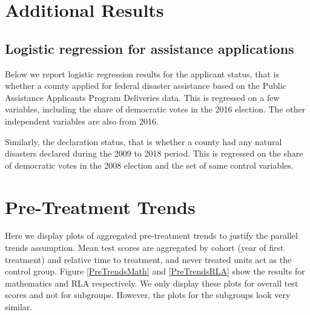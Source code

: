 
\section{Additional Results} \label{AppendixA}

\subsection{Logistic regression for assistance applications}

Below we report logistic regression results for the applicant status, that is whether a county applied for federal disaster assistance based on the Public Assistance Applicants Program Deliveries data. This is regressed on a few variables, including the share of democratic votes in the 2016 election. The other independent variables are also from 2016.

Similarly, the declaration status, that is whether a county had any natural disasters declared during the 2009 to 2018 period. This is regressed on the share of democratic votes in the 2008 election and the set of same control variables.




\section{Pre-Treatment Trends} \label{PreTrends}

Here we display plots of aggregated pre-treatment trends to justify the parallel trends assumption. Mean test scores are aggregated by cohort (year of first treatment) and relative time to treatment, and never treated units act as the control group. Figure \ref{PreTrendsMath} and \ref{PreTrendsRLA} show the results for mathematics and RLA respectively. We only display these plots for overall test scores and not for subgroups. However, the plots for the subgroups look very similar.


